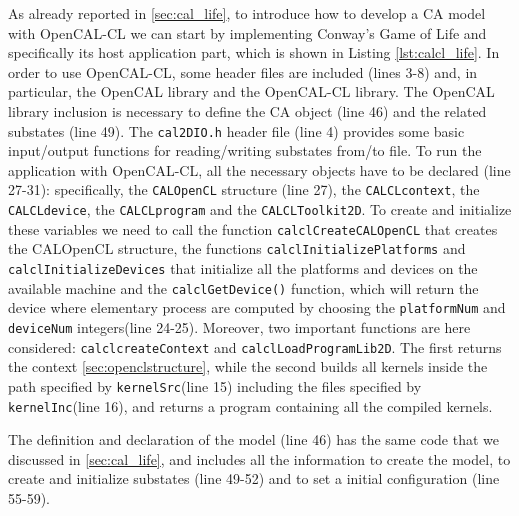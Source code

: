 As already reported in \ref{sec:cal_life}, to introduce how to develop
a CA model with OpenCAL-CL we can start by implementing Conway’s Game
of Life and specifically its host application part, which is shown in
Listing \ref{lst:calcl_life}. In order to use OpenCAL-CL, some header
files are included (lines 3-8) and, in particular, the OpenCAL library
and the OpenCAL-CL library. The OpenCAL library inclusion is necessary
to define the CA object (line 46) and the related substates (line
49). The \verb'cal2DIO.h' header file (line 4) provides some basic
input/output functions for reading/writing substates from/to file. To
run the application with OpenCAL-CL, all the necessary objects have to
be declared (line 27-31): specifically, the \verb'CALOpenCL' structure
(line 27), the \verb'CALCLcontext', the \verb'CALCLdevice', the
\verb'CALCLprogram' and the \verb'CALCLToolkit2D'. To create and
initialize these variables we need to call the function
\verb'calclCreateCALOpenCL' that creates the CALOpenCL structure, the
functions \verb|calclInitializePlatforms| and
\verb|calclInitializeDevices| that initialize all the platforms and
devices on the available machine and the \verb'calclGetDevice()'
function, which will return the device where elementary process are
computed by choosing the \verb'platformNum' and \verb'deviceNum'
integers(line 24-25). Moreover, two important functions are here
considered: \verb'calclcreateContext' and
\verb'calclLoadProgramLib2D'. The first returns the context
\ref{sec:openclstructure}, while the second builds all kernels inside
the path specified by \verb'kernelSrc'(line 15) including the files
specified by \verb'kernelInc'(line 16), and returns a program
containing all the compiled kernels.

The definition and declaration of the model (line 46) has the same code
that we discussed in \ref{sec:cal_life}, and includes all the information
to create the model, to create and initialize substates (line 49-52) and 
to set a initial configuration (line 55-59).


	
